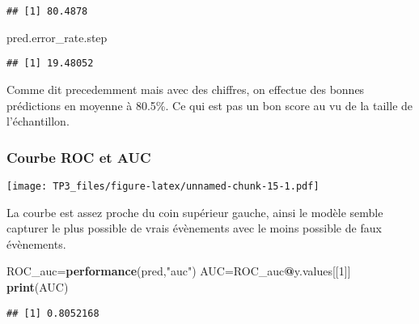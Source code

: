 \documentclass[
]{article}
\newenvironment{Shaded}{\begin{snugshade}}{\end{snugshade}}
\newcommand{\DecValTok}[1]{\textcolor[rgb]{0.00,0.00,0.81}{#1}}
\newcommand{\KeywordTok}[1]{\textcolor[rgb]{0.13,0.29,0.53}{\textbf{#1}}}
\newcommand{\NormalTok}[1]{#1}
\newcommand{\OperatorTok}[1]{\textcolor[rgb]{0.81,0.36,0.00}{\textbf{#1}}}
\newcommand{\StringTok}[1]{\textcolor[rgb]{0.31,0.60,0.02}{#1}}
\begin{document}
\begin{verbatim}
## [1] 80.4878
\end{verbatim}

\begin{Shaded}
\begin{Highlighting}[]
\NormalTok{pred.error_rate.step}
\end{Highlighting}
\end{Shaded}

\begin{verbatim}
## [1] 19.48052
\end{verbatim}

Comme dit precedemment mais avec des chiffres, on effectue des bonnes
prédictions en moyenne à 80.5\%. Ce qui est pas un bon score au vu de la
taille de l'échantillon.

\hypertarget{courbe-roc-et-auc}{%
\subsubsection{Courbe ROC et AUC}\label{courbe-roc-et-auc}}

\begin{Shaded}
\end{Shaded}

\texttt{[image: TP3\_files/figure-latex/unnamed-chunk-15-1.pdf]}

La courbe est assez proche du coin supérieur gauche, ainsi le modèle
semble capturer le plus possible de vrais évènements avec le moins
possible de faux évènements.

\begin{Shaded}
\begin{Highlighting}[]
\NormalTok{ROC_auc=}\KeywordTok{performance}\NormalTok{(pred,}\StringTok{"auc"}\NormalTok{)}
\NormalTok{AUC=ROC_auc}\OperatorTok{@}\NormalTok{y.values[[}\DecValTok{1}\NormalTok{]]}
\KeywordTok{print}\NormalTok{(AUC)}
\end{Highlighting}
\end{Shaded}

\begin{verbatim}
## [1] 0.8052168
\end{verbatim}
\end{document}
